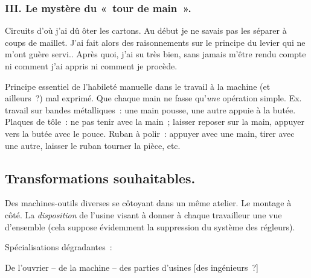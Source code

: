 \documentclass[french,twoside]{book} %
\begin{document}
\subsubsection[III. Le mystère du « tour de main ».]{III. Le mystère du « tour de main ».}
\noindent \par
Circuits d'où j'ai dû ôter les cartons. Au début je ne savais pas les séparer à coups de maillet. J'ai fait alors des raisonnements sur le principe du levier qui ne m'ont guère servi.. Après quoi, j'ai su très bien, sans jamais m'être rendu compte ni comment j'ai appris ni comment je procède.\par
Principe essentiel de l'habileté manuelle dans le travail à la machine (et ailleurs ?) mal exprimé. Que chaque main ne fasse qu'{\itshape une} opération simple. Ex. travail sur bandes métalliques : une main pousse, une autre appuie à la butée. Plaques de tôle : ne pas tenir avec la main ; laisser reposer sur la main, appuyer vers la butée avec le pouce. Ruban à polir : appuyer avec une main, tirer avec une autre, laisser le ruban tourner la pièce, etc.
\subsection[Transformations souhaitables.]{Transformations souhaitables.}
\noindent \par
Des machines-outils diverses se côtoyant dans un même atelier. Le montage à côté. La {\itshape disposition} de l'usine visant à donner à chaque travailleur une vue d'ensemble (cela suppose évidemment la suppression du système des régleurs).\par
Spécialisations dégradantes :\par
De l'ouvrier – de la machine – des parties d'usines [des ingénieurs ?]
\end{document}
